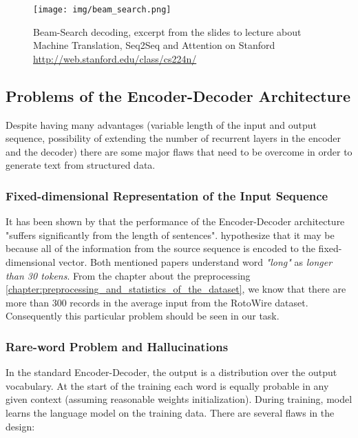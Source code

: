 \begin{figure}[!h]
    \centering
    \texttt{[image: img/beam\_search.png]}
    \caption{\centering Beam-Search decoding, excerpt from the slides to lecture about Machine Translation, Seq2Seq and Attention on Stanford \url{http://web.stanford.edu/class/cs224n/}} \label{figure:beam_search}
\end{figure}


\subsection{Problems of the Encoder-Decoder Architecture}

Despite having many advantages (variable length of the input and output sequence, possibility of extending the number of recurrent layers in the encoder and the decoder) there are some major flaws that need to be overcome in order to generate text from structured data.

\subsubsection{Fixed-dimensional Representation of the Input Sequence} \label{subsubsection:fixed_dimensional_repre_problem}

It has been shown by \citet{cho2014properties} that the performance of the Encoder-Decoder architecture "suffers significantly from the length of sentences". \citet{bahdanau2016neural} hypothesize that it may be because all of the information from the source sequence is encoded to the fixed-dimensional vector. Both mentioned papers understand word \emph{"long"} as \emph{longer than 30 tokens}. From the chapter about the preprocessing \ref{chapter:preprocessing_and_statistics_of_the_dataset}, we know that there are more than 300 records in the average input from the RotoWire dataset. Consequently this particular problem should be seen in our task. 

\subsubsection{Rare-word Problem and Hallucinations} \label{subsubsection:rare_word_problem}

In the standard Encoder-Decoder, the output is a distribution over the output vocabulary. At the start of the training each word is equally probable in any given context (assuming reasonable weights initialization). During training, model learns the language model on the training data. There are several flaws in the design:

